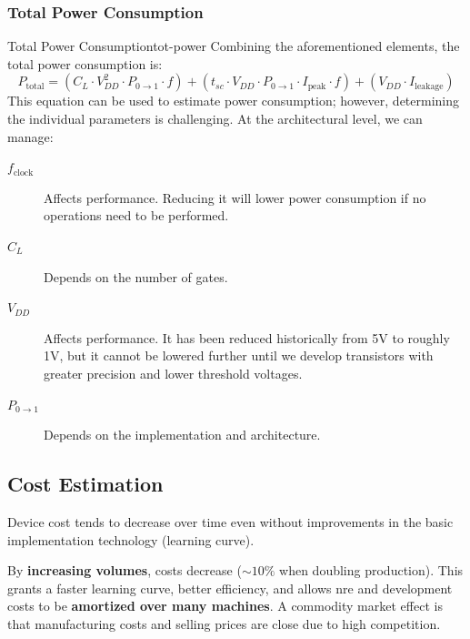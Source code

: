 \subsubsection{Total Power Consumption}
\begin{definition}{Total Power Consumption}{tot-power}
    Combining the aforementioned elements, the total power consumption is:
    \[
        P_{\text{total}} = \left(C_{L} \cdot V^2_{DD} \cdot P_{0\rightarrow1} \cdot f\right) + \left(t_{sc} \cdot V_{DD} \cdot P_{0\rightarrow1} \cdot I_{\text{peak}} \cdot f\right) + \left(V_{DD} \cdot I_{\text{leakage}}\right)
    \]
    This equation can be used to estimate power consumption; however, determining the individual parameters is challenging. At the architectural level, we can manage:
    \begin{description}
        \item[\(f_{\text{clock}}\)] Affects performance. Reducing it will lower power consumption if no operations need to be performed.
        \item[\(C_{L}\)] Depends on the number of gates.
        \item[\(V_{DD}\)] Affects performance. It has been reduced historically from 5V to roughly 1V, but it cannot be lowered further until we develop transistors with greater precision and lower threshold voltages.
        \item[\(P_{0\rightarrow1}\)] Depends on the implementation and architecture.
    \end{description}
\end{definition}

\subsection{Cost Estimation}
Device cost tends to decrease over time even without improvements in the basic implementation technology (learning curve).

By \textbf{increasing volumes}, costs decrease (\(\sim 10\%\) when doubling production). This grants a faster learning curve, better efficiency, and allows \gls{nre} and development costs to be \textbf{amortized over many machines}. A commodity market effect is that manufacturing costs and selling prices are close due to high competition.


